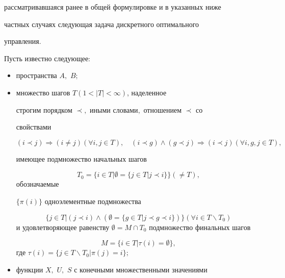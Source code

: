 рассматривавшаяся ранее в общей формулировке и в указанных ниже

частных случаях следующая задача дискретного оптимального

управления.



\smallskip



\hypertarget{ovch:zadmm}{}



\begin{task}[$\mathfrak{A}$] Пусть известно следующее\/{\rm :}





\begin{itemize}



\item[--] пространства $A,$ $B;$



\item[--] множество шагов $T(1<| T| <\infty )$,  наделенное

строгим порядком $\prec,$ иными словами$,$  отношением $\prec$ со

свойствами 

$$(i\prec j) \Rightarrow ({i\ne j})(\forall i,j\in

T),\quad  (i\prec g)\wedge (g\prec j)\Rightarrow (i\prec j)(\forall

i,g,j\in T),$$ 

имеющее подмножество начальных шагов 

$$T_0 =\{i\in

T\vert \emptyset =\{j\in T\vert j\prec i\}\}(\ne T),$$ обозначаемые

$\{\pi(i)\}$ одноэлементные подмножества 

$$\big \{j\in T\vert (j\prec

i)\wedge (\emptyset =\{g\in T\vert j\prec g\prec i\})\big\}(\forall i\in

T\backslash T_0 )$$ и удовлетворяющее равенству $\emptyset =M\cap

T_0$ подмножество финальных шагов 

$$M=\{i\in T\vert \tau

(i)=\emptyset\},$$ где $\tau (i)=\{j\in T\backslash T_0 \vert \pi

(j)=i\};$



\item[--] функции $X,$ $U,$ $S$ с конечными множественными значениями 


\end{itemize}
\end{task}
